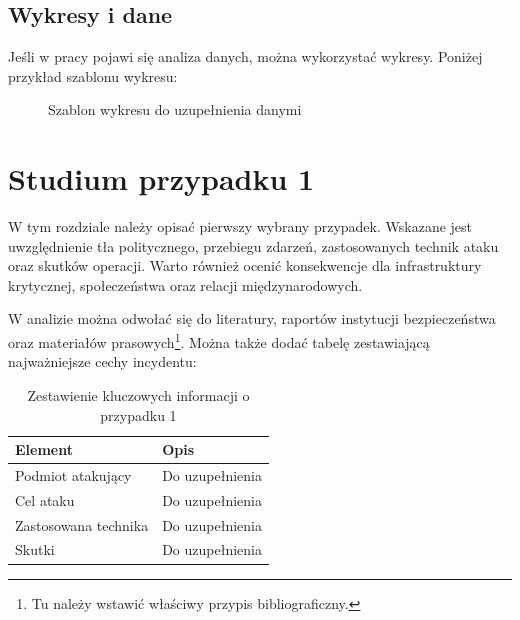 \documentclass[12pt,a4paper]{article}
\begin{document}
\subsection{Wykresy i dane}
Jeśli w pracy pojawi się analiza danych, można wykorzystać wykresy. Poniżej przykład szablonu wykresu:

\begin{figure}[H]
    \centering
    \caption{Szablon wykresu do uzupełnienia danymi}
    \label{fig:chart-placeholder}
\end{figure}

\section{Studium przypadku 1}
W tym rozdziale należy opisać pierwszy wybrany przypadek. Wskazane jest uwzględnienie tła politycznego, przebiegu zdarzeń, zastosowanych technik ataku oraz skutków operacji. Warto również ocenić konsekwencje dla infrastruktury krytycznej, społeczeństwa oraz relacji międzynarodowych.

W analizie można odwołać się do literatury, raportów instytucji bezpieczeństwa oraz materiałów prasowych\footnote{Tu należy wstawić właściwy przypis bibliograficzny.}. Można także dodać tabelę zestawiającą najważniejsze cechy incydentu:

\begin{table}[H]
    \centering
    \caption{Zestawienie kluczowych informacji o przypadku 1}
    \begin{tabular}{p{5cm}p{8cm}}
        \toprule
        Element & Opis \\
        \midrule
        Podmiot atakujący & Do uzupełnienia \\
        Cel ataku & Do uzupełnienia \\
        Zastosowana technika & Do uzupełnienia \\
        Skutki & Do uzupełnienia \\
        \bottomrule
    \end{tabular}
\end{table}
\end{document}
